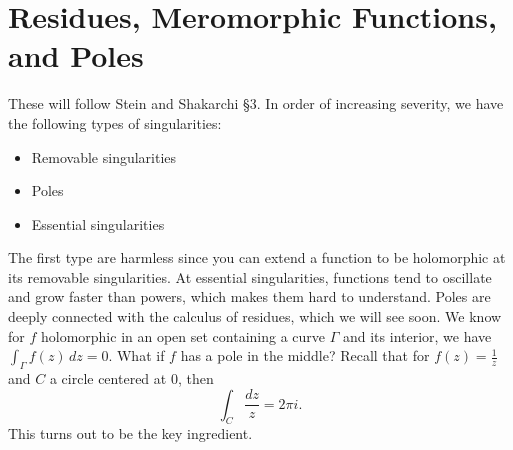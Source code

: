 \section{Residues, Meromorphic Functions, and Poles}
These will follow Stein and Shakarchi \S 3.
\orbreak
In order of increasing severity, we have the following types of singularities:
\begin{itemize}
    \item Removable singularities
    \item Poles
    \item Essential singularities
\end{itemize}
The first type are harmless since you can extend a function to be holomorphic at its removable singularities. At essential singularities, functions tend to oscillate and grow faster than powers, which makes them hard to understand. Poles are deeply connected with the calculus of residues, which we will see soon. We know for $f$ holomorphic in an open set containing a curve $\Gamma $ and its interior, we have $\int_{\Gamma }^{} f(z) \, dz=0$. What if $f$ has a pole in the middle? Recall that for $f(z)=\frac{1}{z}$ and $C$ a circle centered at $0$, then \[
\int_{C}^{} \frac{dz}{z}=2\pi i.
\] This turns out to be the key ingredient.
